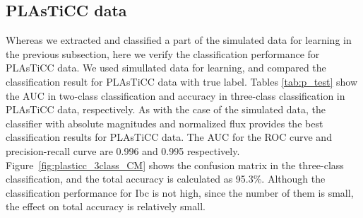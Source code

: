 \documentclass[useamsfonts]{pasj01}
\begin{document}
\subsection{PLAsTiCC data}
Whereas we extracted and classified a part of the simulated data for learning in the previous subsection, here we verify the classification performance for PLAsTiCC data.
We used simullated data for learning, and compared the classification result for PLAsTiCC data with true label.
Tables \ref{tab:p_test} show the AUC in two-class classification and accuracy in three-class classification in PLAsTiCC data, respectively.
As with the case of the simulated data, the classifier with absolute magnitudes and normalized flux provides the best classification results for PLAsTiCC data.
The AUC for the ROC curve and precision-recall curve are 0.996 and 0.995 respectively.
Figure\ \ref{fig:plasticc_3class_CM} shows the confusion matrix in the three-class classification, and the total accuracy is calculated as 95.3\%.
Although the classification performance for Ibc is not high, since the number of them is small, the effect on total accuracy is relatively small.
%
\end{document}
